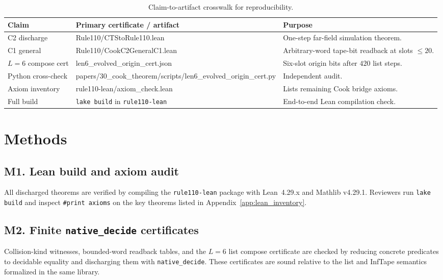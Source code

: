 \documentclass[11pt]{article}
\theoremstyle{remark}
\begin{document}
\clearpage
\begin{table}[H]
\centering
\caption{Claim-to-artifact crosswalk for reproducibility.}
\label{tab:claim_artifact_crosswalk}
\small
\renewcommand{\arraystretch}{1.15}
\begin{tabularx}{\linewidth}{@{}p{2.2cm}>{\RaggedRight\ttfamily\footnotesize}p{3.8cm}>{\RaggedRight}X@{}}
\toprule
\textbf{Claim} & \textbf{\normalfont Primary certificate / artifact} & \textbf{Purpose} \\
\midrule
C2 discharge & Rule110/\allowbreak CTStoRule110.lean & One-step far-field simulation theorem. \\
C1 general & Rule110/\allowbreak CookC2GeneralC1.lean & Arbitrary-word tape-bit readback at slots $\le 20$. \\
$L{=}6$ compose cert & len6\_\allowbreak evolved\_\allowbreak origin\_\allowbreak cert.json & Six-slot origin bits after $420$ list steps. \\
Python cross-check & papers/30\_\allowbreak cook\_theorem/\allowbreak scripts/\allowbreak len6\_\allowbreak evolved\_\allowbreak origin\_\allowbreak cert.py & Independent audit. \\
Axiom inventory & rule110-lean/\allowbreak axiom\_check.lean & Lists remaining Cook bridge axioms. \\
Full build & \texttt{lake build} in \allowbreak\texttt{rule110-lean} & End-to-end Lean compilation check. \\
\bottomrule
\end{tabularx}
\end{table}

\section*{Methods}

\subsection*{M1. Lean build and axiom audit}
All discharged theorems are verified by compiling the \texttt{rule110-lean} package with Lean~4.29.x and Mathlib v4.29.1.
Reviewers run \texttt{lake build} and inspect \texttt{\#print axioms} on the key theorems listed in Appendix~\ref{app:lean_inventory}.

\subsection*{M2. Finite \texttt{native\_decide} certificates}
Collision-kind witnesses, bounded-word readback tables, and the $L{=}6$ list compose certificate are checked by reducing concrete predicates to decidable equality and discharging them with \texttt{native\_decide}.
These certificates are sound relative to the list and InfTape semantics formalized in the same library.
\end{document}
